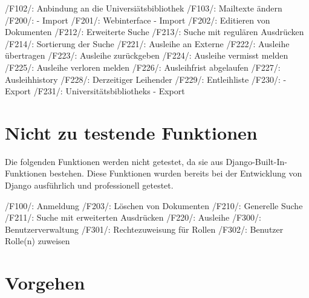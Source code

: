 
/F102/: Anbindung an die Universiätsbibliothek
/F103/: Mailtexte ändern
/F200/: \BibTex - Import %
/F201/: Webinterface - Import
/F202/: Editieren von Dokumenten
/F212/: Erweiterte Suche %
/F213/: Suche mit regulären Ausdrücken %
/F214/: Sortierung der Suche
/F221/: Ausleihe an Externe
/F222/: Ausleihe übertragen
/F223/: Ausleihe zurückgeben
/F224/: Ausleihe vermisst melden
/F225/: Ausleihe verloren melden
/F226/: Ausleihfrist abgelaufen
/F227/: Ausleihhistory
/F228/: Derzeitiger Leihender %
/F229/: Entleihliste
/F230/: \BibTex - Export %
/F231/: Universitätsbibliotheks - Export


\section{Nicht zu testende Funktionen}



Die folgenden Funktionen werden nicht getestet, da sie aus
Django-Built-In-Funktionen bestehen. Diese Funktionen wurden bereits bei der
Entwicklung von Django ausführlich und professionell getestet.

/F100/: Anmeldung
/F203/: Löschen von Dokumenten
/F210/: Generelle Suche
/F211/: Suche mit erweiterten Ausdrücken
/F220/: Ausleihe
/F300/: Benutzerverwaltung
/F301/: Rechtezuweisung für Rollen
/F302/: Benutzer Rolle(n) zuweisen

\section{Vorgehen}

